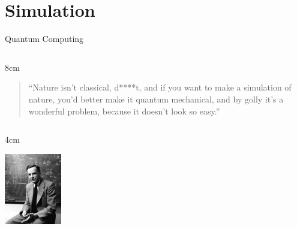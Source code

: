 \section{Simulation}


\newcommand\cols[1]{
\begin{columnsonlytextwidth}
	#1
\end{columnsonlytextwidth}
}
\newcommand\col[2]{
\begin{column}{#1}
	#2
\end{column}
}


\begin{refsection}
\begin{frame}{Quantum Computing}

\centering

\cols{
	\col{8cm}{
		\begin{quote}
		``Nature isn't classical, d****t, and if you want to make a simulation of nature, you'd better make it quantum mechanical, and by golly it's a wonderful problem, because it doesn't look so easy.''
		\end{quote}
	}
	\col{4cm}{
		\includegraphics[width=2.5cm]{pics/feynman.jpg}
	}
}


\end{frame}
\end{refsection}
